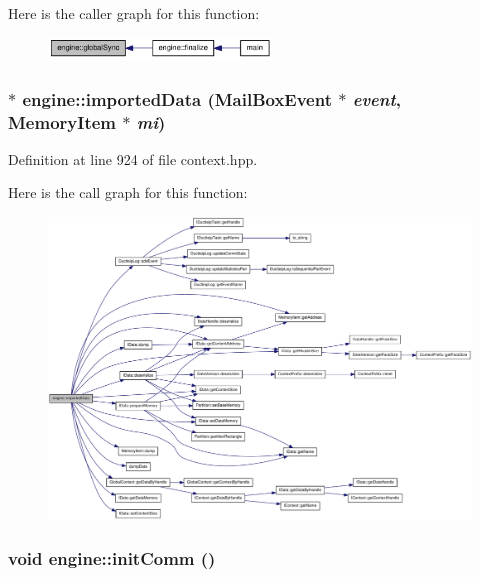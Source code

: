 Here is the caller graph for this function:\nopagebreak
\begin{figure}[H]
\begin{center}
\leavevmode
\includegraphics[width=168pt]{classengine_a9bc79f83757312b0ff06a7cfbe0c1c65_icgraph}
\end{center}
\end{figure}
\hypertarget{classengine_af65fff57c4729b10421eaa064a254d64}{
\subsubsection[{importedData}]{ $\ast$ engine::importedData ({\bf MailBoxEvent} $\ast$ {\em event}, \/  {\bf MemoryItem} $\ast$ {\em mi})}}
\label{classengine_af65fff57c4729b10421eaa064a254d64}


Definition at line 924 of file context.hpp.

Here is the call graph for this function:\nopagebreak
\begin{figure}[H]
\begin{center}
\leavevmode
\includegraphics[width=420pt]{classengine_af65fff57c4729b10421eaa064a254d64_cgraph}
\end{center}
\end{figure}
\hypertarget{classengine_ac26f49a93305875e96b66807e9344f7d}{
\subsubsection[{initComm}]{\setlength{\rightskip}{0pt plus 5cm}void engine::initComm ()}}
\label{classengine_ac26f49a93305875e96b66807e9344f7d}


